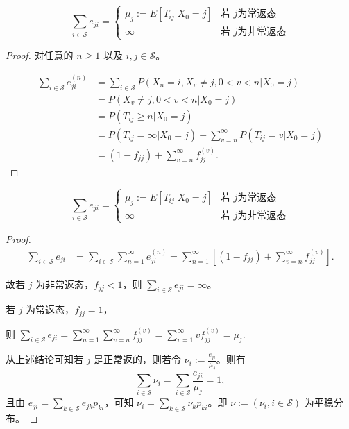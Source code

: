 \documentclass[lang=cn,10pt,thmcnt=section]{elegantbook}
\begin{document}
\begin{lemma}
	\[
\sum_{i \in \mathcal{S}} e_{ji} = 
\begin{cases} 
\mu_j := E[T_{ij} | X_0 = j] & \text{若 } j \text{为常返态} \\
\infty & \text{若 } j \text{为非常返态}
\end{cases}
\]

\end{lemma}
\begin{proof}
	对任意的 $n \geq 1$ 以及 $i, j \in \mathcal{S}$。

\begin{align*}
\sum_{i \in \mathcal{S}} e_{ji}^{(n)} &= \sum_{i \in \mathcal{S}} P(X_n = i, X_v \neq j, 0 < v < n | X_0 = j) \\
&= P(X_v \neq j, 0 < v < n | X_0 = j) \\
&= P(T_{ij} \geq n | X_0 = j) \\
&= P(T_{ij} = \infty | X_0 = j) + \sum_{v=n}^{\infty} P(T_{ij} = v | X_0 = j) \\
&= (1 - f_{jj}) + \sum_{v=n}^{\infty} f_{jj}^{(v)}.
\end{align*}
\end{proof}
\begin{lemma}
	\[
\sum_{i \in \mathcal{S}} e_{ji} = 
\begin{cases} 
\mu_j := E[T_{ij} | X_0 = j] & \text{若 } j \text{为常返态} \\
\infty & \text{若 } j \text{为非常返态}
\end{cases}
\]
\end{lemma}
\begin{proof}
	\begin{align*}
		\sum_{i \in \mathcal{S}} e_{ji} &= \sum_{i \in \mathcal{S}} \sum_{n=1}^{\infty} e_{ji}^{(n)} = \sum_{n=1}^{\infty} \left[ (1 - f_{jj}) + \sum_{v=n}^{\infty} f_{jj}^{(v)} \right].
		\end{align*}
		
		故若 $j$ 为非常返态，$f_{jj} < 1$，则 $\sum_{i \in \mathcal{S}} e_{ji} = \infty$。
		
		若 $j$ 为常返态，$f_{jj} = 1$，
		
		则 $\sum_{i \in \mathcal{S}} e_{ji} = \sum_{n=1}^{\infty} \sum_{v=n}^{\infty} f_{jj}^{(v)} = \sum_{v=1}^{\infty} v f_{jj}^{(v)} = \mu_j$.
		
		从上述结论可知若 $j$ 是正常返的，则若令 $\nu_i := \frac{e_{ji}}{\mu_j}$。则有
		\[
		\sum_{i \in \mathcal{S}} \nu_i = \sum_{i \in \mathcal{S}} \frac{e_{ji}}{\mu_j} = 1,
		\]
		且由 $e_{ji} = \sum_{k \in \mathcal{S}} e_{jk} p_{ki}$，可知 $\nu_i = \sum_{k \in \mathcal{S}} \nu_k p_{ki}$。即 $\nu := (\nu_i, i \in \mathcal{S})$ 为平稳分布。
\end{proof}
\end{document}
